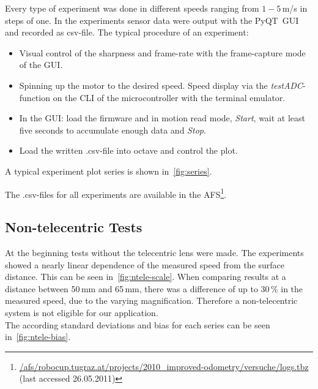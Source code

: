 \documentclass[12pt,a4paper]{article}
\begin{document}
Every type of experiment was done in different speeds ranging from $1-5$\,m/s in steps of one.
In the experiments sensor data were output with the PyQT~GUI and recorded as csv-file.
The typical procedure of an experiment: 
\begin{itemize}
 \item Visual control of the sharpness and frame-rate with the frame-capture mode of the GUI.
 \item Spinning up the motor to the desired speed. Speed display via the \emph{testADC}-function on the CLI of the microcontroller with the terminal emulator.
 \item In the GUI: load the firmware and in motion read mode, \emph{Start}, wait at least five seconds to accumulate enough data and \emph{Stop}.
 \item Load the written .csv-file into octave and control the plot.
\end{itemize}

A typical experiment plot series is shown in~\autoref{fig:series}. 



The .csv-files for all experiments are available in the AFS\footnote{\url{/afs/robocup.tugraz.at/projects/2010_improved-odometry/versuche/logs.tbz} (last accessed 26.05.2011)}.




\subsection{Non-telecentric Tests}

At the beginning tests without the telecentric lens were made.
The experiments showed a nearly linear dependence of the measured speed from the surface distance.
This can be seen in~\autoref{fig:ntele-scale}. 
When comparing results at a distance between 50\,mm and 65\,mm, there was a difference of up to 30\,\% in the measured speed, due to the varying magnification. 
Therefore a non-telecentric system is not  eligible for our application.\\
The according standard deviations and bias for each series can be seen in~\autoref{fig:ntele-bias}.
\end{document}
